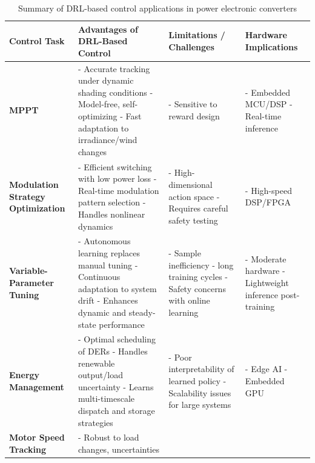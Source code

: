 \begin{table}[t] 
\centering
\caption{Summary of DRL-based control applications in power electronic converters}
\label{tab:DRL_ControlSummary}
\renewcommand{\arraystretch}{1.3}
\setlength{\tabcolsep}{6pt}
\begin{tabular}{|p{2.5cm}|p{6.5cm}|p{4.5cm}|p{3.5cm}|}
\hline
\textbf{Control Task} & \textbf{Advantages of DRL-Based Control} & \textbf{Limitations / Challenges} & \textbf{Hardware Implications} \\
\hline
\textbf{MPPT} & 
- Accurate tracking under dynamic shading conditions \newline
- Model-free, self-optimizing \newline
- Fast adaptation to irradiance/wind changes & 
- Sensitive to reward design & 
- Embedded MCU/DSP \newline
- Real-time inference \\
\hline
\textbf{Modulation Strategy Optimization} & 
- Efficient switching with low power loss \newline
- Real-time modulation pattern selection \newline
- Handles nonlinear dynamics & 
- High-dimensional action space \newline
- Requires careful safety testing & 
- High-speed DSP/FPGA \\
\hline
\textbf{Variable-Parameter Tuning} & 
- Autonomous learning replaces manual tuning \newline
- Continuous adaptation to system drift \newline
- Enhances dynamic and steady-state performance & 
- Sample inefficiency \newline
- long training cycles \newline
- Safety concerns with online learning & 
- Moderate hardware  \newline
- Lightweight inference post-training \\
\hline
\textbf{Energy Management} & 
- Optimal scheduling of DERs \newline
- Handles renewable output/load uncertainty \newline
- Learns multi-timescale dispatch and storage strategies & 
- Poor interpretability of learned policy \newline
- Scalability issues for large systems & 
- Edge AI \newline
- Embedded GPU \\
\hline
\textbf{Motor Speed Tracking} & 
- Robust to load changes, uncertainties \newline

\end{tabular}
\end{table}
